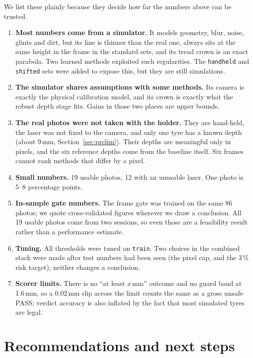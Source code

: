 We list these plainly because they decide how far the numbers above can be trusted.

\begin{enumerate}
\item \textbf{Most numbers come from a simulator.} It models geometry, blur, noise, glints and dirt, but its line is
      thinner than the real one, always sits at the same height in the frame in the standard sets, and its tread
      crown is an exact parabola. Two learned methods exploited such regularities. The \texttt{handheld} and
      \texttt{shifted} sets were added to expose this, but they are still simulations.
\item \textbf{The simulator shares assumptions with some methods.} Its camera is exactly the physical calibration
      model, and its crown is exactly what the robust depth stage fits. Gains in those two places are upper bounds.
\item \textbf{The real photos were not taken with the holder.} They are hand-held, the laser was not fixed to the
      camera, and only one tyre has a known depth (about 9\,mm, Section~\ref{sec:prelim}). Their depths are meaningful only in pixels, and the six
      reference depths come from the baseline itself. Six frames cannot rank methods that differ by a pixel.
\item \textbf{Small numbers.} 19 usable photos, 12 with an unusable laser. One photo is 5--8 percentage points.
\item \textbf{In-sample gate numbers.} The frame gate was trained on the same 86 photos; we quote cross-validated
      figures wherever we draw a conclusion. All 19 usable photos come from two sessions, so even those are a
      feasibility result rather than a performance estimate.
\item \textbf{Tuning.} All thresholds were tuned on \texttt{train}. Two choices in the combined stack were made
      after test numbers had been seen (the pixel cap, and the 3\,\% risk target); neither changes a conclusion.
\item \textbf{Scorer limits.} There is no ``at least $x$\,mm'' outcome and no guard band at 1.6\,mm, so a 0.02\,mm
      slip across the limit counts the same as a gross unsafe PASS; verdict accuracy is also inflated by the fact
      that most simulated tyres are legal.
\end{enumerate}

\section{Recommendations and next steps}

